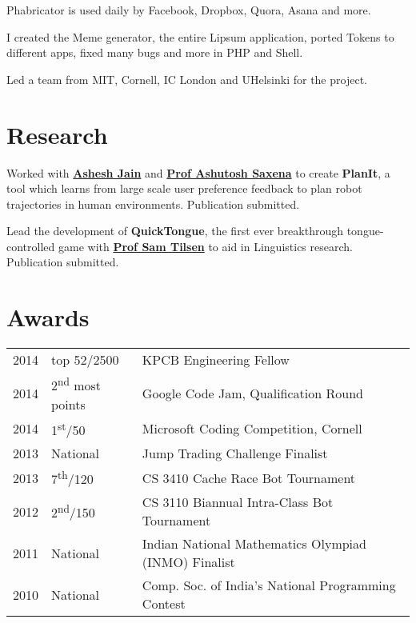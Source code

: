 \documentclass[]{deedy-resume-openfont}
\begin{document}
\begin{minipage}[t]{0.66\textwidth}
\begin{tightemize}
\item Phabricator is used daily by Facebook, Dropbox, Quora, Asana and more.
\item I created the Meme generator, the entire Lipsum application, ported Tokens to different apps, fixed many bugs and more in PHP and Shell.
\item Led a team from MIT, Cornell, IC London and UHelsinki for the project.
\end{tightemize}
\sectionsep


\section{Research}
Worked with \textbf{\href{http://www.cs.cornell.edu/~ashesh/}{Ashesh Jain}} and \textbf{\href{http://www.cs.cornell.edu/~asaxena/}{Prof Ashutosh Saxena}} to create \textbf{PlanIt}, a tool which  learns from large scale user preference feedback to plan robot trajectories in human environments.  Publication submitted.
\sectionsep

Lead the development of \textbf{QuickTongue}, the first ever breakthrough tongue-controlled game with \textbf{\href{http://conf.ling.cornell.edu/~tilsen/}{Prof Sam Tilsen}} to aid in Linguistics research. Publication submitted.
\sectionsep


\section{Awards} 
\begin{tabular}{rll}
2014	     & top 52/2500  & KPCB Engineering Fellow\\
2014	     & 2\textsuperscript{nd} most points  & Google Code Jam, Qualification Round\\
2014	     & 1\textsuperscript{st}/50  & Microsoft Coding Competition, Cornell\\
2013	     & National  & Jump Trading Challenge Finalist\\
2013     & 7\textsuperscript{th}/120 & CS 3410 Cache Race Bot Tournament  \\
2012     & 2\textsuperscript{nd}/150 & CS 3110 Biannual Intra-Class Bot Tournament \\
2011     & National & Indian National Mathematics Olympiad (INMO) Finalist \\
2010     & National & Comp. Soc. of India's National Programming Contest\\
\end{tabular}
\sectionsep


\end{minipage}
\end{document}
